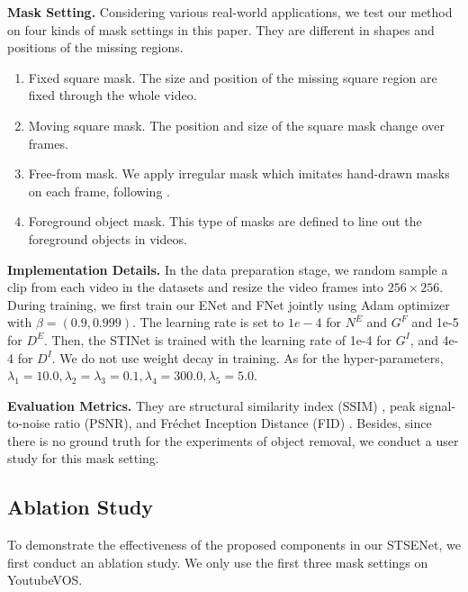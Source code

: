 \noindent \textbf{Mask Setting.} Considering various real-world applications, we test our method on four kinds of mask settings in this paper. 
They are different in shapes and positions of the missing regions.
\begin{enumerate}
	\item Fixed square mask. The size and position of the missing square region are fixed through the whole video. 
	\item Moving square mask. The position and size of the square mask change over frames. 
	\item Free-from mask. We apply irregular mask which imitates hand-drawn masks on each frame, following \cite{liu2018partialinpainting}. 
	\item Foreground object mask. This type of masks are defined to line out the foreground objects in videos.
\end{enumerate}

	
\noindent \textbf{Implementation Details.} 
In the data preparation stage, we random sample a clip  from each video in the datasets and resize the video frames into $256\times256$.
%
During training, we first train our ENet and FNet jointly using Adam optimizer with $\beta=(0.9, 0.999)$.
The learning rate is set to $1e-4$ for $N^E$ and $G^F$ and 1e-5 for $D^E$. Then, the STINet is trained with the learning rate of 1e-4 for $G^I$, and 4e-4 for $D^I$. We do not use weight decay in training.
As for the hyper-parameters, $\lambda_1=10.0,\lambda_2=\lambda_3=0.1,\lambda_4=300.0,\lambda_5=5.0$.

\noindent \textbf{Evaluation Metrics.} 
 They are structural similarity index (SSIM) \cite{wang2004image}, peak signal-to-noise ratio (PSNR), and Fr{\'e}chet Inception Distance (FID) \cite{heusel2017gans}. 
%
Besides, since there is no ground truth for the experiments of object removal, we conduct a user study for this mask setting. 


\subsection{Ablation Study}
To demonstrate the effectiveness of the proposed components in our STSENet, we first conduct an ablation study. 
We only use the first three mask settings on YoutubeVOS.

